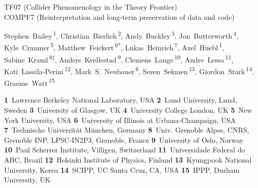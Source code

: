 \documentclass[11pt]{article}
\begin{document}
\pubblock
\snowmass{}


\begin{center}{\large
TF07 (Collider Phenomenology in the Theory Frontier)\\
COMPF7 (Reinterpretation and long-term preservation of data and code)}
\end{center}

\begin{center}
Stephen~Bailey\,\textsuperscript{1}, 
Christian~Bierlich\,\textsuperscript{2},
Andy~Buckley\,\textsuperscript{3},
Jon~Butterworth\,\textsuperscript{4},
Kyle~Cranmer\,\textsuperscript{5},
Matthew~Feickert\,\textsuperscript{6*},
Lukas~Heinrich\,\textsuperscript{7},
Axel~Huebl\,\textsuperscript{1},  
Sabine~Kraml\,\textsuperscript{8$\ddagger$},
Anders~Kvellestad\,\textsuperscript{9},
Clemens~Lange\,\textsuperscript{10},
Andre~Lessa\,\textsuperscript{11},
Kati~Lassila-Perini\,\textsuperscript{12},
Mark~S.~Neubauer\,\textsuperscript{6},  
Sezen~Sekmen\,\textsuperscript{13},
Giordon~Stark\,\textsuperscript{14},
Graeme~Watt\,\textsuperscript{15}
\end{center}

\begin{center}
\textbf{1}~Lawrence Berkeley National Laboratory, USA
\textbf{2}~Lund University, Lund, Sweden
\textbf{3}~University of Glasgow, UK
\textbf{4}~University College London, UK
\textbf{5}~New York University, USA
\textbf{6}~University of Illinois at Urbana-Champaign, USA
\textbf{7}~Technische Universität München, Germany
\textbf{8}~Univ. Grenoble Alpes, CNRS, Grenoble INP, LPSC-IN2P3, Grenoble, France
\textbf{9}~University of Oslo, Norway
\textbf{10}~Paul Scherrer Institute, Villigen, Switzerland
\textbf{11}~Universidade Federal do ABC, Brazil
\textbf{12}~Helsinki Institute of Physics, Finland
\textbf{13}~Kyungpook National University, Korea
\textbf{14}~SCIPP, UC Santa Cruz, CA, USA
\textbf{15}~IPPP, Durham University, UK
\end{center}
\end{document}
